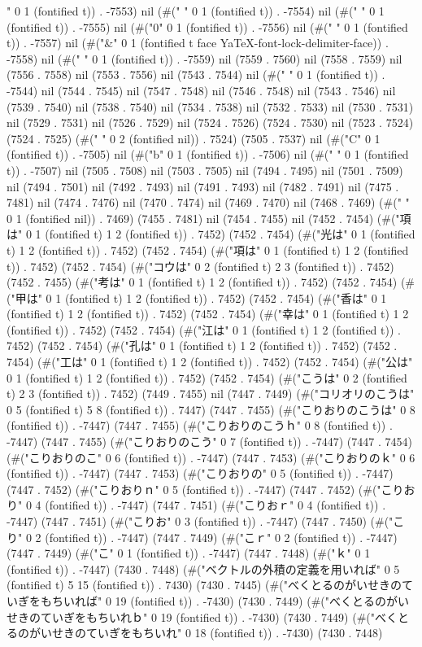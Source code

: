 " 0 1 (fontified t)) . -7553) nil (#(" " 0 1 (fontified t)) . -7554) nil (#(" " 0 1 (fontified t)) . -7555) nil (#("0" 0 1 (fontified t)) . -7556) nil (#(" " 0 1 (fontified t)) . -7557) nil (#("&" 0 1 (fontified t face YaTeX-font-lock-delimiter-face)) . -7558) nil (#(" " 0 1 (fontified t)) . -7559) nil (7559 . 7560) nil (7558 . 7559) nil (7556 . 7558) nil (7553 . 7556) nil (7543 . 7544) nil (#(" " 0 1 (fontified t)) . -7544) nil (7544 . 7545) nil (7547 . 7548) nil (7546 . 7548) nil (7543 . 7546) nil (7539 . 7540) nil (7538 . 7540) nil (7534 . 7538) nil (7532 . 7533) nil (7530 . 7531) nil (7529 . 7531) nil (7526 . 7529) nil (7524 . 7526) (7524 . 7530) nil (7523 . 7524) (7524 . 7525) (#("  " 0 2 (fontified nil)) . 7524) (7505 . 7537) nil (#("C" 0 1 (fontified t)) . -7505) nil (#("b" 0 1 (fontified t)) . -7506) nil (#(" " 0 1 (fontified t)) . -7507) nil (7505 . 7508) nil (7503 . 7505) nil (7494 . 7495) nil (7501 . 7509) nil (7494 . 7501) nil (7492 . 7493) nil (7491 . 7493) nil (7482 . 7491) nil (7475 . 7481) nil (7474 . 7476) nil (7470 . 7474) nil (7469 . 7470) nil (7468 . 7469) (#(" " 0 1 (fontified nil)) . 7469) (7455 . 7481) nil (7454 . 7455) nil (7452 . 7454) (#("項は" 0 1 (fontified t) 1 2 (fontified t)) . 7452) (7452 . 7454) (#("光は" 0 1 (fontified t) 1 2 (fontified t)) . 7452) (7452 . 7454) (#("項は" 0 1 (fontified t) 1 2 (fontified t)) . 7452) (7452 . 7454) (#("コウは" 0 2 (fontified t) 2 3 (fontified t)) . 7452) (7452 . 7455) (#("考は" 0 1 (fontified t) 1 2 (fontified t)) . 7452) (7452 . 7454) (#("甲は" 0 1 (fontified t) 1 2 (fontified t)) . 7452) (7452 . 7454) (#("香は" 0 1 (fontified t) 1 2 (fontified t)) . 7452) (7452 . 7454) (#("幸は" 0 1 (fontified t) 1 2 (fontified t)) . 7452) (7452 . 7454) (#("江は" 0 1 (fontified t) 1 2 (fontified t)) . 7452) (7452 . 7454) (#("孔は" 0 1 (fontified t) 1 2 (fontified t)) . 7452) (7452 . 7454) (#("工は" 0 1 (fontified t) 1 2 (fontified t)) . 7452) (7452 . 7454) (#("公は" 0 1 (fontified t) 1 2 (fontified t)) . 7452) (7452 . 7454) (#("こうは" 0 2 (fontified t) 2 3 (fontified t)) . 7452) (7449 . 7455) nil (7447 . 7449) (#("コリオリのこうは" 0 5 (fontified t) 5 8 (fontified t)) . 7447) (7447 . 7455) (#("こりおりのこうは" 0 8 (fontified t)) . -7447) (7447 . 7455) (#("こりおりのこうｈ" 0 8 (fontified t)) . -7447) (7447 . 7455) (#("こりおりのこう" 0 7 (fontified t)) . -7447) (7447 . 7454) (#("こりおりのこ" 0 6 (fontified t)) . -7447) (7447 . 7453) (#("こりおりのｋ" 0 6 (fontified t)) . -7447) (7447 . 7453) (#("こりおりの" 0 5 (fontified t)) . -7447) (7447 . 7452) (#("こりおりｎ" 0 5 (fontified t)) . -7447) (7447 . 7452) (#("こりおり" 0 4 (fontified t)) . -7447) (7447 . 7451) (#("こりおｒ" 0 4 (fontified t)) . -7447) (7447 . 7451) (#("こりお" 0 3 (fontified t)) . -7447) (7447 . 7450) (#("こり" 0 2 (fontified t)) . -7447) (7447 . 7449) (#("こｒ" 0 2 (fontified t)) . -7447) (7447 . 7449) (#("こ" 0 1 (fontified t)) . -7447) (7447 . 7448) (#("ｋ" 0 1 (fontified t)) . -7447) (7430 . 7448) (#("ベクトルの外積の定義を用いれば" 0 5 (fontified t) 5 15 (fontified t)) . 7430) (7430 . 7445) (#("べくとるのがいせきのていぎをもちいれば" 0 19 (fontified t)) . -7430) (7430 . 7449) (#("べくとるのがいせきのていぎをもちいれｂ" 0 19 (fontified t)) . -7430) (7430 . 7449) (#("べくとるのがいせきのていぎをもちいれ" 0 18 (fontified t)) . -7430) (7430 . 7448) 